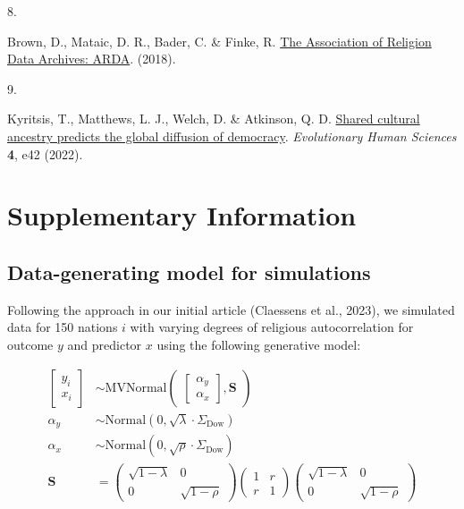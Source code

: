 \documentclass[
  11pt,
]{article}
\newlength{\cslhangindent}
\newlength{\csllabelwidth}
\newlength{\cslentryspacingunit} %
\newenvironment{CSLReferences}[2] %
 {%
  \setlength{\parindent}{0pt}
  \ifodd #1
  \let\oldpar\par
  \def\par{\hangindent=\cslhangindent\oldpar}
  \fi
  \setlength{\parskip}{#2\cslentryspacingunit}
 }%
 {}
\newcommand{\CSLLeftMargin}[1]{\parbox[t]{\csllabelwidth}{#1}}
\newcommand{\CSLRightInline}[1]{\parbox[t]{\linewidth - \csllabelwidth}{#1}\break}
\begin{document}
\begin{CSLReferences}{0}{0}
\leavevmode{}%
\CSLLeftMargin{8. }%
\CSLRightInline{Brown, D., Mataic, D. R., Bader, C. \& Finke, R. \href{https://www.thearda.com/}{{The Association of Religion Data Archives: ARDA}}. (2018).}

\leavevmode{}%
\CSLLeftMargin{9. }%
\CSLRightInline{Kyritsis, T., Matthews, L. J., Welch, D. \& Atkinson, Q. D. \href{https://doi.org/10.1017/ehs.2022.40}{Shared cultural ancestry predicts the global diffusion of democracy}. \emph{Evolutionary Human Sciences} \textbf{4}, e42 (2022).}

\end{CSLReferences}

\newpage

\section*{Supplementary Information}

\subsection*{Data-generating model for simulations}

Following the approach in our initial article (Claessens et al., 2023), we 
simulated data for 150 nations $i$ with varying degrees of religious 
autocorrelation for outcome $y$ and predictor $x$ using the following
generative model:

\begin{align}
\begin{bmatrix}y_i\\x_i \end{bmatrix} &\sim \text{MVNormal}
\begin{pmatrix}\begin{bmatrix}\alpha_y\\\alpha_x \end{bmatrix},
\textbf{S}\end{pmatrix} \nonumber \\
\alpha_y &\sim \text{Normal}(0, \sqrt{\lambda} \cdot \Sigma_\text{Dow}) 
\nonumber \\
\alpha_x &\sim \text{Normal}(0, \sqrt{\rho} \cdot \Sigma_\text{Dow}) 
\nonumber \\
\textbf{S} &= 
\begin{pmatrix}\sqrt{1 - \lambda} & 0 \\ 0 & \sqrt{1 - \rho} \end{pmatrix}
\begin{pmatrix}1 & r \\ r & 1\end{pmatrix}
\begin{pmatrix}\sqrt{1 - \lambda} & 0 \\ 0 & \sqrt{1 - \rho} \end{pmatrix} 
\nonumber
\end{align}
\end{document}
